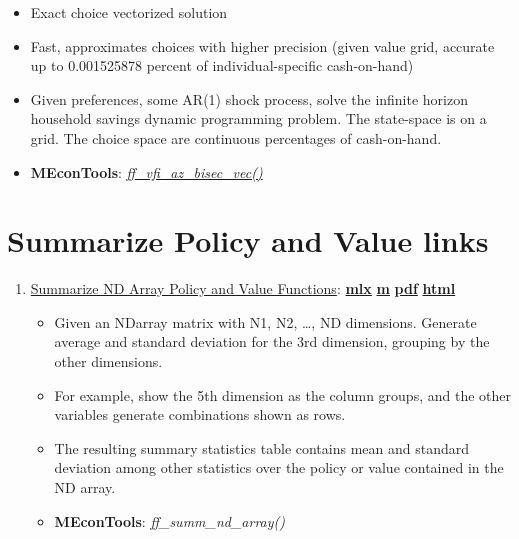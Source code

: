 \documentclass[
]{book}
\providecommand{\tightlist}{%
  \setlength{\itemsep}{0pt}\setlength{\parskip}{0pt}}
\begin{document}
\begin{enumerate}
  \begin{itemize}
  \tightlist
  \item
    Exact choice vectorized solution
  \item
    Fast, approximates choices with higher precision (given value grid, accurate up to 0.001525878 percent of individual-specific cash-on-hand)
  \item
    Given preferences, some AR(1) shock process, solve the infinite horizon household savings dynamic programming problem. The state-space is on a grid. The choice space are continuous percentages of cash-on-hand.
  \item
    \textbf{MEconTools}: \emph{\href{https://github.com/FanWangEcon/MEconTools/blob/master/MEconTools/vfi/ff_vfi_az_bisec_vec.m}{ff\_vfi\_az\_bisec\_vec()}}
  \end{itemize}
\end{enumerate}

\hypertarget{summarize-policy-and-value-links}{%
\section{Summarize Policy and Value links}\label{summarize-policy-and-value-links}}

\begin{enumerate}
\def\labelenumi{\arabic{enumi}.}
\tightlist
\item
  \href{https://fanwangecon.github.io/MEconTools/MEconTools/doc/summ/htmlpdfm/fx_summ_nd_array.html}{Summarize ND Array Policy and Value Functions}: \href{https://github.com/FanWangEcon/MEconTools/blob/master/MEconTools/doc/summ/fx_summ_nd_array.mlx}{\textbf{mlx}} \textbar{} \href{https://github.com/FanWangEcon/MEconTools/blob/master/MEconTools/doc/summ/htmlpdfm/fx_summ_nd_array.m}{\textbf{m}} \textbar{} \href{https://github.com/FanWangEcon/MEconTools/blob/master/MEconTools/doc/summ/htmlpdfm/fx_summ_nd_array.pdf}{\textbf{pdf}} \textbar{} \href{https://fanwangecon.github.io/MEconTools/MEconTools/doc/summ/htmlpdfm/fx_summ_nd_array.html}{\textbf{html}}

  \begin{itemize}
  \tightlist
  \item
    Given an NDarray matrix with N1, N2, \ldots, ND dimensions. Generate average and standard deviation for the 3rd dimension, grouping by the other dimensions.
  \item
    For example, show the 5th dimension as the column groups, and the other variables generate combinations shown as rows.
  \item
    The resulting summary statistics table contains mean and standard deviation among other statistics over the policy or value contained in the ND array.
  \item
    \textbf{MEconTools}: \emph{ff\_summ\_nd\_array()}
  \end{itemize}
\end{enumerate}
\end{document}
